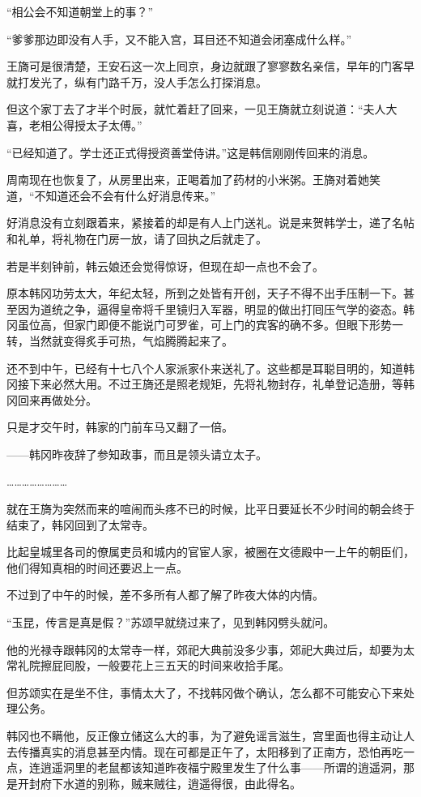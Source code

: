 “相公会不知道朝堂上的事？”

“爹爹那边即没有人手，又不能入宫，耳目还不知道会闭塞成什么样。”

王旖可是很清楚，王安石这一次上囘京，身边就跟了寥寥数名亲信，早年的门客早就打发光了，纵有门路千万，没人手怎么打探消息。

但这个家丁去了才半个时辰，就忙着赶了回来，一见王旖就立刻说道：“夫人大喜，老相公得授太子太傅。”

“已经知道了。学士还正式得授资善堂侍讲。”这是韩信刚刚传回来的消息。

周南现在也恢复了，从房里出来，正喝着加了药材的小米粥。王旖对着她笑道，“不知道还会不会有什么好消息传来。”

好消息没有立刻跟着来，紧接着的却是有人上门送礼。说是来贺韩学士，递了名帖和礼单，将礼物在门房一放，请了回执之后就走了。

若是半刻钟前，韩云娘还会觉得惊讶，但现在却一点也不会了。

原本韩冈功劳太大，年纪太轻，所到之处皆有开创，天子不得不出手压制一下。甚至因为道统之争，逼得皇帝将千里镜归入军器，明显的做出打囘压气学的姿态。韩冈虽位高，但家门即便不能说门可罗雀，可上门的宾客的确不多。但眼下形势一转，当然就变得炙手可热，气焰腾腾起来了。

还不到中午，已经有十七八个人家派家仆来送礼了。这些都是耳聪目明的，知道韩冈接下来必然大用。不过王旖还是照老规矩，先将礼物封存，礼单登记造册，等韩冈回来再做处分。

只是才交午时，韩家的门前车马又翻了一倍。

——韩冈昨夜辞了参知政事，而且是领头请立太子。

……………………

就在王旖为突然而来的喧闹而头疼不已的时候，比平日要延长不少时间的朝会终于结束了，韩冈回到了太常寺。

比起皇城里各司的僚属吏员和城内的官宦人家，被圈在文德殿中一上午的朝臣们，他们得知真相的时间还要迟上一点。

不过到了中午的时候，差不多所有人都了解了昨夜大体的内情。

“玉昆，传言是真是假？”苏颂早就绕过来了，见到韩冈劈头就问。

他的光禄寺跟韩冈的太常寺一样，郊祀大典前没多少事，郊祀大典过后，却要为太常礼院擦屁囘股，一般要花上三五天的时间来收拾手尾。

但苏颂实在是坐不住，事情太大了，不找韩冈做个确认，怎么都不可能安心下来处理公务。

韩冈也不瞒他，反正像立储这么大的事，为了避免谣言滋生，宫里面也得主动让人去传播真实的消息甚至内情。现在可都是正午了，太阳移到了正南方，恐怕再吃一点，连逍遥洞里的老鼠都该知道昨夜福宁殿里发生了什么事——所谓的逍遥洞，那是开封府下水道的别称，贼来贼往，逍遥得很，由此得名。

